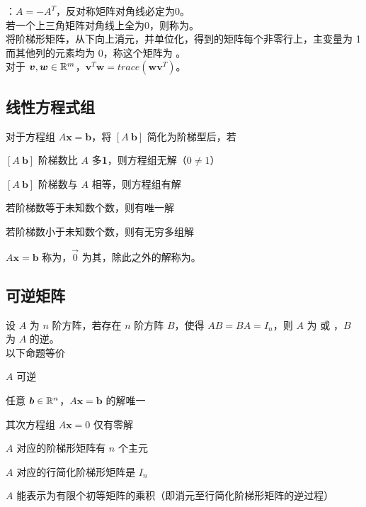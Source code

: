 \documentclass[./main.tex]{subfiles}
\begin{document}
：$A=-A^T$，反对称矩阵对角线必定为0。\\

若一个上三角矩阵对角线上全为0，则称为。\\

将阶梯形矩阵，从下向上消元，并单位化，得到的矩阵每个非零行上，主变量为 1 而其他列的元素均为 0，称这个矩阵为 。\\

对于 $\bm{v},\bm{w}\in\mathbb{R}^{m}$，$\bm{v}^T\bm{w} = trace(\bm{w}\bm{v}^T)$。

\subsection{线性方程式组}

对于方程组 $A\bm{x}=\bm{b}$，将 $[A\ \bm{b}]$ 简化为阶梯型后，若

\begin{enumerate*}
    \item $[A\ \bm{b}]$ 阶梯数比 $A$ 多\textbf{1}，则方程组无解（$0\neq 1$）
    \item $[A\ \bm{b}]$ 阶梯数与 $A$ 相等，则方程组有解
    \begin{enumerate*}
        \item 若阶梯数等于未知数个数，则有唯一解
        \item 若阶梯数小于未知数个数，则有无穷多组解
    \end{enumerate*}
\end{enumerate*}

$A\bm{x}=\bm{b}$ 称为，$\vec{0}$ 为其，除此之外的解称为。

\subsection{可逆矩阵}

设 $A$ 为 $n$ 阶方阵，若存在 $n$ 阶方阵 $B$，使得 $AB=BA=I_n$，则 $A$ 为  或 ，$B$ 为 $A$ 的逆。\\

以下命题等价
\begin{enumerate*}
    \item $A$ 可逆
    \item 任意 $\bm{b}\in\mathbb{R}^{n}$，$A\bm{x}=\bm{b}$ 的解唯一
    \item 其次方程组 $A\bm{x}=0$ 仅有零解
    \item $A$ 对应的阶梯形矩阵有 $n$ 个主元
    \item $A$ 对应的行简化阶梯形矩阵是 $I_n$
    \item $A$ 能表示为有限个初等矩阵的乘积（即消元至行简化阶梯形矩阵的逆过程）
\end{enumerate*}
\end{document}
